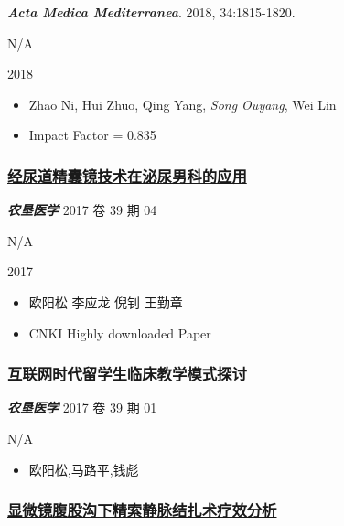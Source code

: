 \documentclass[]{article}
\providecommand{\tightlist}{%
  \setlength{\itemsep}{0pt}\setlength{\parskip}{0pt}}
\begin{document}
\emph{\textbf{Acta Medica Mediterranea}}. 2018, 34:1815-1820.

N/A

2018

\begin{itemize}
\tightlist
\item
  Zhao Ni, Hui Zhuo, Qing Yang, \emph{\emph{Song Ouyang}}, Wei Lin
\item
  Impact Factor = 0.835
\end{itemize}

\hypertarget{ux7ecfux5c3fux9053ux7cbeux56caux955cux6280ux672fux5728ux6cccux5c3fux7537ux79d1ux7684ux5e94ux7528}{%
\subsubsection{\texorpdfstring{\href{https://doi.org/10.3969/j.issn.1008-1127.2017.04.009}{经尿道精囊镜技术在泌尿男科的应用}}{经尿道精囊镜技术在泌尿男科的应用}}\label{ux7ecfux5c3fux9053ux7cbeux56caux955cux6280ux672fux5728ux6cccux5c3fux7537ux79d1ux7684ux5e94ux7528}}

\emph{\textbf{农垦医学}} 2017 卷 39 期 04

N/A

2017

\begin{itemize}
\tightlist
\item
  欧阳松 李应龙 倪钊 王勤章
\item
   CNKI Highly downloaded Paper
\end{itemize}

\hypertarget{ux4e92ux8054ux7f51ux65f6ux4ee3ux7559ux5b66ux751fux4e34ux5e8aux6559ux5b66ux6a21ux5f0fux63a2ux8ba8}{%
\subsubsection{\texorpdfstring{\href{https://doi.org/10.3969/j.issn.1008-1127.2017.01.025}{互联网时代留学生临床教学模式探讨}}{互联网时代留学生临床教学模式探讨}}\label{ux4e92ux8054ux7f51ux65f6ux4ee3ux7559ux5b66ux751fux4e34ux5e8aux6559ux5b66ux6a21ux5f0fux63a2ux8ba8}}

\emph{\textbf{农垦医学}} 2017 卷 39 期 01

N/A

\begin{itemize}
\tightlist
\item
  欧阳松,马路平,钱彪
\end{itemize}

\hypertarget{ux663eux5faeux955cux8179ux80a1ux6c9fux4e0bux7cbeux7d22ux9759ux8109ux7ed3ux624eux672fux7597ux6548ux5206ux6790}{%
\subsubsection{\texorpdfstring{\href{https://doi.org/10.3969/j.issn.1009-8291.2017.03.010}{显微镜腹股沟下精索静脉结扎术疗效分析}}{显微镜腹股沟下精索静脉结扎术疗效分析}}\label{ux663eux5faeux955cux8179ux80a1ux6c9fux4e0bux7cbeux7d22ux9759ux8109ux7ed3ux624eux672fux7597ux6548ux5206ux6790}}
\end{document}
